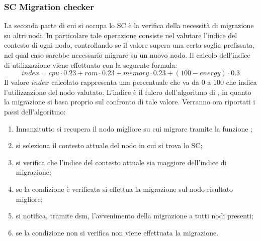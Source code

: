 \subsubsection{SC Migration checker}
La seconda parte di cui si occupa lo SC è la verifica della necessità di migrazione su altri nodi. In particolare tale operazione consiste nel valutare l'indice del contesto di ogni nodo, controllando se il valore supera una certa soglia prefissata, nel qual caso sarebbe necessario migrare su un nuovo nodo. Il calcolo dell'indice di utilizzazione viene effettuato con la seguente formula:
\begin{equation}\label{eq:index}
index = cpu \cdot 0.23 + ram \cdot 0.23 + memory \cdot 0.23 + (100-energy) \cdot 0.3
\end{equation}
Il valore $index$ calcolato rappresenta una percentuale che va da 0 a 100 che indica l'utilizzazione del nodo valutato. L'indice è il fulcro dell'algoritmo di , in quanto la migrazione si basa proprio sul confronto di tale valore. Verranno ora riportati i passi dell'algoritmo:
\begin{enumerate}
	\item Innanzitutto si recupera il nodo migliore su cui migrare tramite la funzione ;
	\item si seleziona il contesto attuale del nodo in cui si trova lo SC;
	\item si verifica che l'indice del contesto attuale sia maggiore dell'indice di migrazione;
	\item se la condizione è verificata si effettua la migrazione sul nodo risultato migliore;
	\item si notifica, tramite dsm, l'avvenimento della migrazione a tutti nodi presenti;
	\item se la condizione non si verifica non viene effettuata la migrazione.
\end{enumerate}
